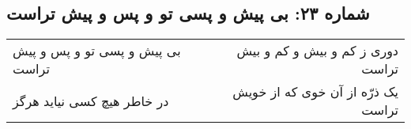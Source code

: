 \begin{center}
\section*{شماره ۲۳: بی پیش و پسی تو و پس و پیش تراست}
\label{sec:023}
\begin{longtable}{l p{0.5cm} r}
بی پیش و پسی تو و پس و پیش تراست
&&
دوری ز کم و بیش و کم و بیش تراست
\\
در خاطر هیچ کسی نیاید هرگز
&&
یک ذرّه از آن خوی که از خویش تراست
\\
\end{longtable}
\end{center}
